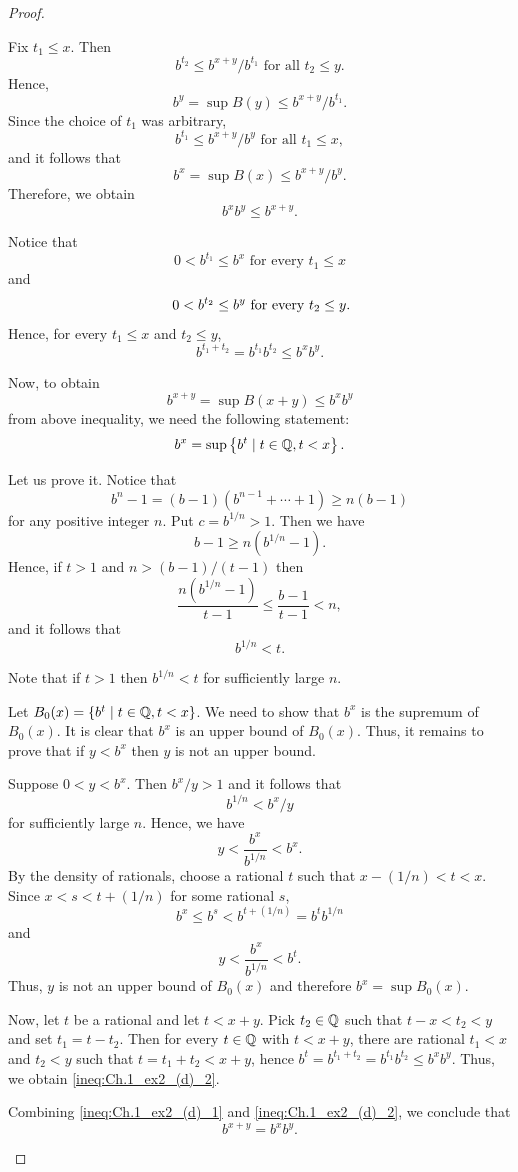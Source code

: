 \begin{proof}
\begin{enumerate}
Fix $t_1\leq x$. Then 
\[
b^{t_2} \leq b^{x+y}/b^{t_1} \text{ for all } t_2 \leq y.
\]
Hence, 
\[
b^y = \sup B(y) \leq b^{x+y}/b^{t_1}.
\]
Since the choice of $t_1$ was arbitrary,
\[
b^{t_1} \leq b^{x+y}/b^y \text{ for all } t_1 \leq x,
\]
and it follows that
\[
b^x = \sup B(x) \leq b^{x+y}/b^y.
\]
Therefore, we obtain
\begin{equation} \label{ineq:Ch.1_ex2_(d)_1}
    b^xb^y \leq b^{x+y}.
\end{equation}

Notice that 
\[
0 < b^{t_1} \leq b^x \text{ for every } t_1 \leq x
\]
and 
\[
0 < b^{t_2} \leq b^y \text{ for every } t_2 \leq y \mathrlap{.}
\]
Hence, for every $t_1 \leq x$ and $t_2 \leq y$, 
\[
b^{t_1+t_2} = b^{t_1}b^{t_2} \leq b^xb^y.
\]

Now, to obtain
\begin{equation}\label{ineq:Ch.1_ex2_(d)_2}
b^{x+y} = \sup B(x+y) \leq b^xb^y
\end{equation}
from above inequality, we need the following statement:
\[
b^x=\sup \left\{b^t \mid t \in \mathbb{Q}, t<x\right\}.
\]

Let us prove it. Notice that
\[
b^n-1=(b-1)(b^{n-1}+ \cdots + 1) \geq n(b-1)
\]
for any positive integer $n$. Put $c=b^{1/n}>1$. Then we have
\[
b-1 \geq n(b^{1/n}-1).
\]
Hence, if $t>1$ and $n>(b-1)/(t-1)$ then
\[
\frac{n(b^{1/n}-1)}{t-1} \leq \frac{b-1}{t-1} < n,
\]
and it follows that
\[
b^{1/n}<t.
\]

Note that if $t>1$ then $b^{1/n}<t$ for sufficiently large $n$.

Let $B_0(x)=\left\{b^t \mid t \in \mathbb{Q}, t<x\right\}$.
We need to show that $b^x$ is the supremum of $B_0(x)$. 
It is clear that $b^x$ is an upper bound of $B_0(x)$.
Thus, it remains to prove that if $y<b^x$ then $y$ is not an upper bound.

Suppose $0<y<b^x$. Then $b^x/y >1$ and it follows that
\[
b^{1/n} <b^x/y
\]
for sufficiently large $n$. 
Hence, we have
\[
y<\frac{b^x}{b^{1/n}}<b^x.
\]
By the density of rationals, choose a rational $t$ such that $x-(1/n)<t<x$. 
Since $x<s<t+(1/n)$ for some rational $s$, 
\[
b^x \leq b^s <b^{t+(1/n)} = b^tb^{1/n}
\]
and
\[
y<\frac{b^x}{b^{1/n}}<b^t.
\]
Thus, $y$ is not an upper bound of $B_0(x)$ and therefore $b^x = \sup B_0(x)$.

Now, let $t$ be a rational and let $t<x+y$.
Pick $t_2 \in \mathbb{Q}$ such that $t-x<t_2<y$ and set $t_1=t-t_2$.
Then for every $t \in \mathbb{Q}$ with $t<x+y$, there are rational $t_1<x$ and $t_2<y$ such that $t=t_1+t_2<x+y$, hence $b^t=b^{t_1+t_2}=b^{t_1}b^{t_2} \leq b^xb^y$.
Thus, we obtain \eqref{ineq:Ch.1_ex2_(d)_2}.

Combining \eqref{ineq:Ch.1_ex2_(d)_1} and \eqref{ineq:Ch.1_ex2_(d)_2}, we conclude that
\[
b^{x+y}=b^xb^y.
\]
\end{enumerate}
\end{proof}

